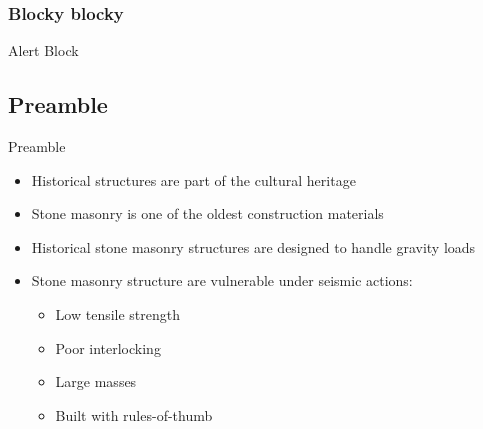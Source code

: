 \documentclass{EESD}
\begin{document}
\begin{frame}
\frametitle{Blocky blocky}

\begin{alertblock}{Alert Block}
\lipsum[1]
\end{alertblock}

\end{frame}

{

\begin{frame}[t]{}

\end{frame}
}


\subsection{Preamble}
\begin{frame}[t]{Preamble}\vspace{4pt}
\begin{itemize}
    \item Historical structures are part of the cultural heritage\vspace{10pt}\pause
    \item Stone masonry is one of the oldest construction materials\vspace{10pt}\pause
    \item Historical stone masonry structures are designed to handle gravity loads\vspace{10pt}\pause
    \item Stone masonry structure are vulnerable under seismic actions:\vspace{5pt}
    \begin{itemize}
        \item Low tensile strength
        \item Poor interlocking
        \item Large masses
        \item Built with rules-of-thumb
    \end{itemize}
\end{itemize}
\end{frame}
\end{document}
